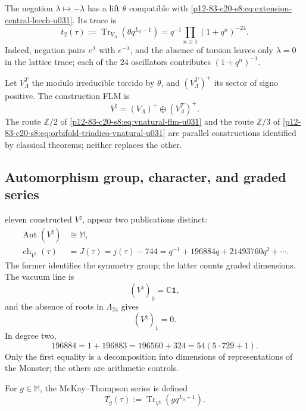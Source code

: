 The negation \(\lambda\mapsto-\lambda\) has a lift
\(\theta\) compatible with \eqref{p12-83-c20-s8:eq:extension-central-leech-u031}. Its trace
is
\begin{equation}
 t_2(\tau)
 :=
 \operatorname{Tr}_{V_\Lambda}
 (\theta q^{L_0-1})
 =q^{-1}\prod_{n\ge1}(1+q^n)^{-24}.
 \label{p12-83-c20-s8:eq:t2-leech-u031}
\end{equation}
Indeed, negation pairs \(e^\lambda\) with \(e^{-\lambda}\), and the
absence of torsion leaves only \(\lambda=0\) in the lattice trace; each
of the 24 oscillators contributes \((1+q^n)^{-1}\).

Let \(V_\Lambda^T\) the modulo irreducible torcido by \(\theta\), and
\((V_\Lambda^T)^+\) its sector of signo positive. The construction FLM is
\begin{equation}
 V^\natural
 =(V_\Lambda)^+\oplus(V_\Lambda^T)^+.
 \label{p12-83-c20-s8:eq:vnatural-flm-u031}
\end{equation}
The route \(\mathbb Z/2\) of
\eqref{p12-83-c20-s8:eq:vnatural-flm-u031} and the route \(\mathbb Z/3\) of
\eqref{p12-83-c20-s8:eq:orbifold-triadico-vnatural-u031} are parallel constructions
identified by classical theorems; neither replaces the other.

\subsection{Automorphism group, character, and graded series}

eleven constructed \(V^\natural\), appear two publications distinct:
\begin{align}
 \operatorname{Aut}(V^\natural)&\cong\mathbb M,
 \label{p12-83-c20-s8:eq:aut-vnatural-monstruo-u031}\\
 \operatorname{ch}_{V^\natural}(\tau)
 &=J(\tau)=j(\tau)-744
 =q^{-1}+196884q+21493760q^2+\cdots.
 \label{p12-83-c20-s8:eq:caracter-vnatural-j-u031}
\end{align}
The former identifies the symmetry group; the latter counts graded
dimensions. The vacuum line is
\[
 (V^\natural)_0=\mathbb C\mathbf1,
\]
and the absence of roots in \(\Lambda_{24}\) gives
\[
 (V^\natural)_1=0.
\]
In degree two,
\[
 196884=1+196883=196560+324=54(5\cdot729+1).
\]
Only the first equality is a decomposition into dimensions of
representations of the Monster; the others are arithmetic controls.

For \(g\in\mathbb M\), the McKay--Thompson series is defined
\begin{equation}
 T_g(\tau):=
 \operatorname{Tr}_{V^\natural}
 \left(gq^{L_0-1}\right).
 \label{p12-83-c20-s8:eq:serie-mckay-thompson-u031}
\end{equation}

